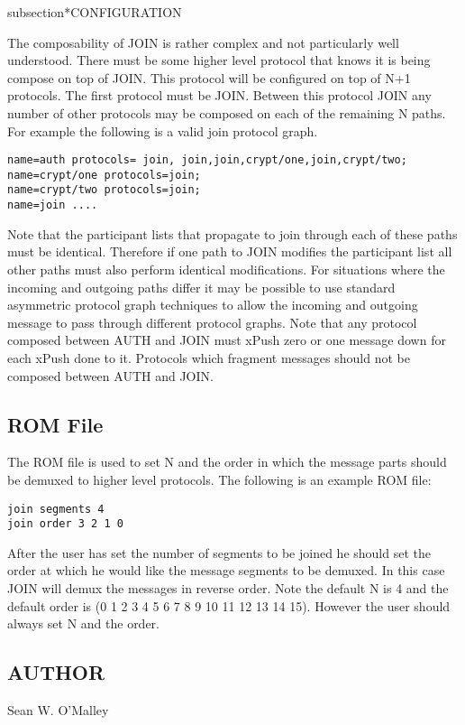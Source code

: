 subsection*{CONFIGURATION}

The composability of JOIN is rather complex and not particularly 
well understood. There must be some higher level protocol that 
knows it is being compose on top of JOIN. This protocol will be 
configured on top of N+1 protocols. The first protocol must be 
JOIN. Between this protocol JOIN any number of other protocols 
may be composed on each of the remaining   N paths. For example 
the following is a valid join protocol graph.

\begin{verbatim}
name=auth protocols= join, join,join,crypt/one,join,crypt/two;
name=crypt/one protocols=join;
name=crypt/two protocols=join;
name=join ....
\end{verbatim}

Note that the participant lists that propagate to join through 
each of these paths must be identical. Therefore if one path to 
JOIN modifies the participant list all other paths must also 
perform identical modifications. For situations where the 
incoming and outgoing paths differ it may be possible to use 
standard asymmetric protocol graph techniques to allow the 
incoming and outgoing message to pass through different protocol 
graphs. Note that any protocol composed between AUTH and JOIN 
must xPush zero or one message down for each xPush done to it. 
Protocols which fragment messages should not be composed 
between AUTH and JOIN. 

\subsection*{ROM File}

The ROM file is used to set N and the order in which the  message 
parts should be demuxed to higher level protocols. The following 
is an example ROM file:

\begin{verbatim}
join segments 4
join order 3 2 1 0
\end{verbatim}

After the user has set the number of segments to be joined he 
should set the order at which he would like the message segments 
to be demuxed. In this case JOIN will demux the messages in 
reverse order. Note the default N is 4 and the default order is (0 
1 2 3 4 5 6 7 8 9 10 11 12 13 14 15). However the user should 
always set N and the order.

\medskip

\subsection*{AUTHOR}

\noindent Sean W. O'Malley


